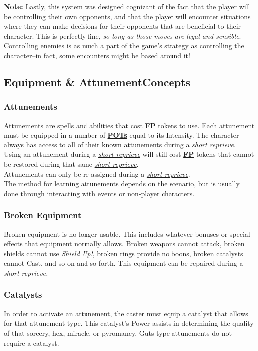 \documentclass[12pt]{article}
\newcommand{\refto}[1]{\hyperlink{#1}{\textbf{#1}}}
\newcommand{\reftoit}[1]{\hyperlink{#1}{\emph{#1}}}
\begin{document}
\begin{multicols*}{2}
\vfill

\begin{tcolorbox}
\textbf{Note:} Lastly, this system was designed cognizant of the fact that the player will be controlling their own opponents, and that the player will encounter situations where they can make decisions for their opponents that are beneficial to their character. This is perfectly fine, \emph{so long as those moves are legal and sensible}. Controlling enemies is as much a part of the game’s strategy as controlling the character--in fact, some encounters might be based around it!
\end{tcolorbox}

\vfill
\pagebreak

\subsection{Equipment \& Attunement\newline Concepts}

\subsubsection{Attunements}
Attunements are spells and abilities that cost \refto{FP} tokens to use. Each attunement must be equipped in a number of \refto{POTs} equal to its Intensity. The character always has access to all of their known attunements during a \reftoit{short reprieve}. Using an attunement during a \reftoit{short reprieve} will still cost \refto{FP} tokens that cannot be restored during that same \reftoit{short reprieve}.\\
Attunements can only be re-assigned during a \reftoit{short reprieve}.\\
The method for learning attunements depends on the scenario, but is usually done through interacting with events or non-player characters.

\subsubsection{Broken Equipment}
Broken equipment is no longer usable. This includes whatever bonuses or special effects that equipment normally allows. Broken weapons cannot attack, broken shields cannot use \reftoit{Shield Up!}, broken rings provide no boons, broken catalysts cannot Cast, and so on and so forth. This equipment can be repaired during a \emph{short reprieve.}

\subsubsection{Catalysts}
In order to activate an attunement, the caster must equip a catalyst that allows for that attunement type. This catalyst’s Power assists in determining the quality of that sorcery, hex, miracle, or pyromancy. Guts-type attunements do not require a catalyst.


\end{multicols*}
\end{document}
